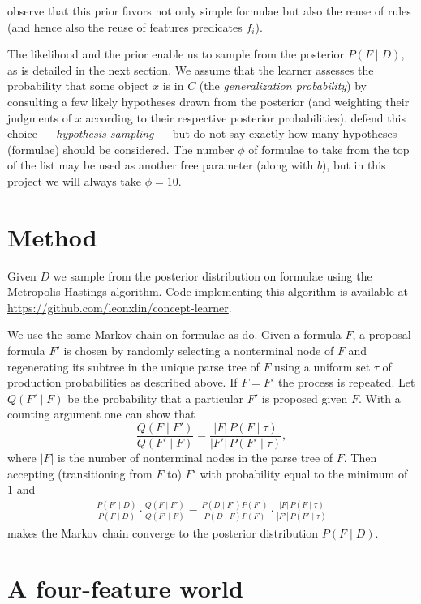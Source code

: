 \documentclass[apacite,jou]{apa6}
\begin{document}
\citet{rrdnf} observe that this prior favors not only simple
formulae but also the reuse of rules (and hence 
also the reuse of features predicates
$f_i$). 

The likelihood and the prior enable us to sample from the posterior
$P(F\mid D)$, as is detailed in the next section. We assume
that the learner assesses the probability that some object $x$
is in $C$
(the \emph{generalization probability})
 by consulting a few likely hypotheses drawn from
the posterior (and weighting their judgments of $x$ according 
to their respective posterior probabilities). \citet{rrdnf}
defend this choice --- \emph{hypothesis sampling} --- but do not
say exactly how many hypotheses (formulae) should be considered.
The number $\phi$ of formulae to take from the
top of the list may be used as another
free parameter (along with $b$), but in this project 
we will always take $\phi=10$.


\section{Method}

Given $D$
we sample from the posterior distribution on formulae
 using the Metropolis-Hastings
algorithm. Code implementing this algorithm is available at
\url{https://github.com/leonxlin/concept-learner}.

We use the same Markov chain on formulae as \citet{rrdnf} do.
Given a formula $F$, a proposal formula $F'$ is chosen by
randomly selecting a nonterminal node of $F$ and regenerating its
subtree in the unique parse tree of $F$ using a uniform set $\tau$ of
production probabilities as described above.
If $F=F'$ the process is repeated. Let $Q(F' \mid F)$ be the 
probability that a particular $F'$ is proposed given $F$.
With a counting argument one can show that
\[ \frac{Q(F\mid F')}{Q(F'\mid F)}
	 = \frac{|F|\,P(F\mid\tau)}{|F'|\,P(F'\mid\tau)}, \]
where $|F|$ is the number of nonterminal nodes in the parse tree
of $F$. Then accepting 
(transitioning from $F$ to)
$F'$ with probability equal to the minimum of $1$ and
\begin{align*}
	\frac{P(F'\mid D)}{P(F\mid D)}\cdot
	\frac{Q(F\mid F')}{Q(F'\mid F)} = 
	\frac{P(D\mid F')P(F')}{P(D\mid F)P(F)}\cdot
	\frac{|F|\,P(F\mid\tau)}{|F'|\,P(F'\mid\tau)}
\end{align*}
makes the Markov chain converge to the posterior distribution
$P(F\mid D)$.


\section{A four-feature world}
\end{document}
